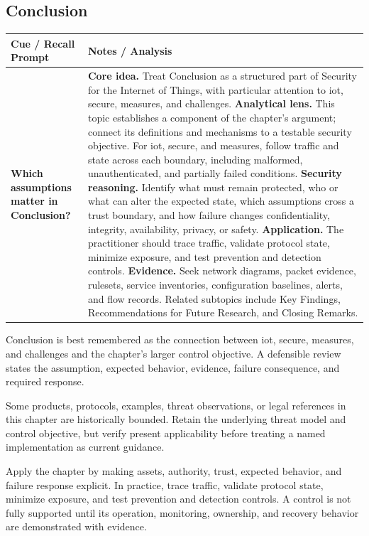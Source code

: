\documentclass[11pt]{article}
\newcommand{\CornellHeader}{%
\rowcolor{Navy}\color{white}\bfseries Cue / Recall Prompt & \color{white}\bfseries Notes / Analysis\\\hline}
\newcommand{\CornellRow}[2]{%
\cellcolor{CueGray}\RaggedRight\textbf{#1} & \RaggedRight #2\\\hline}
\begin{document}
\subsection*{Conclusion}
\begin{longtable}{>{\RaggedRight\arraybackslash}p{}|>{\RaggedRight\arraybackslash}p{}}
\CornellHeader
\CornellRow{Which assumptions matter in Conclusion?}{\textbf{Core idea.} Treat Conclusion as a structured part of Security for the Internet of Things, with particular attention to iot, secure, measures, and challenges. \textbf{Analytical lens.} This topic establishes a component of the chapter's argument; connect its definitions and mechanisms to a testable security objective. For iot, secure, and measures, follow traffic and state across each boundary, including malformed, unauthenticated, and partially failed conditions. \textbf{Security reasoning.} Identify what must remain protected, who or what can alter the expected state, which assumptions cross a trust boundary, and how failure changes confidentiality, integrity, availability, privacy, or safety. \textbf{Application.} The practitioner should trace traffic, validate protocol state, minimize exposure, and test prevention and detection controls. \textbf{Evidence.} Seek network diagrams, packet evidence, rulesets, service inventories, configuration baselines, alerts, and flow records. Related subtopics include Key Findings, Recommendations for Future Research, and Closing Remarks.}
\end{longtable}
\begin{topicsummary}
Conclusion is best remembered as the connection between iot, secure, measures, and challenges and the chapter's larger control objective. A defensible review states the assumption, expected behavior, evidence, failure consequence, and required response.
\end{topicsummary}
\begin{historybox}
Some products, protocols, examples, threat observations, or legal references in this chapter are historically bounded. Retain the underlying threat model and control objective, but verify present applicability before treating a named implementation as current guidance.
\end{historybox}
\begin{defensebox}
Apply the chapter by making assets, authority, trust, expected behavior, and failure response explicit. In practice, trace traffic, validate protocol state, minimize exposure, and test prevention and detection controls. A control is not fully supported until its operation, monitoring, ownership, and recovery behavior are demonstrated with evidence.
\end{defensebox}
\end{document}
